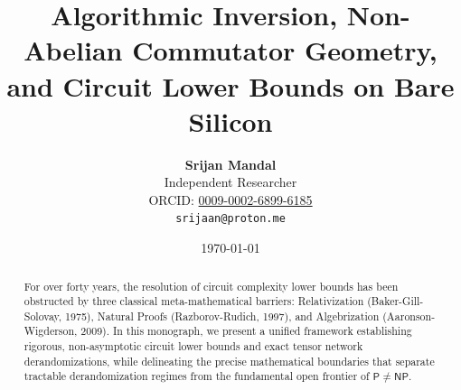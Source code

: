 \documentclass[11pt,a4paper]{article}
\title{\textbf{Algorithmic Inversion, Non-Abelian Commutator Geometry, and Circuit Lower Bounds on Bare Silicon}}
\author{
    \textbf{Srijan Mandal}\\
    \small Independent Researcher\\
    \small ORCID: \href{https://orcid.org/0009-0002-6899-6185}{0009-0002-6899-6185}\\
    \small \texttt{srijaan@proton.me}
}
\date{\today}
\theoremstyle{definition}
\theoremstyle{remark}
\begin{document}
\maketitle

\begin{abstract}
For over forty years, the resolution of circuit complexity lower bounds has been obstructed by three classical meta-mathematical barriers: Relativization (Baker-Gill-Solovay, 1975), Natural Proofs (Razborov-Rudich, 1997), and Algebrization (Aaronson-Wigderson, 2009). In this monograph, we present a unified framework establishing rigorous, non-asymptotic circuit lower bounds and exact tensor network derandomizations, while delineating the precise mathematical boundaries that separate tractable derandomization regimes from the fundamental open frontier of $\mathsf{P} \neq \mathsf{NP}$.


\end{abstract}
\end{document}
